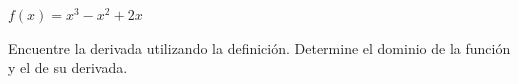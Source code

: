 \item $f(x) = x^3 - x^2 + 2x$
\par
Encuentre la derivada utilizando la definición. Determine el dominio de la función y el de su derivada.
